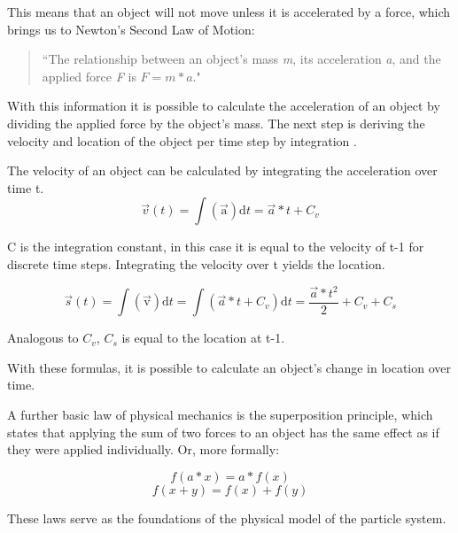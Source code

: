 \documentclass[runningheads,a4paper]{llncs}
\begin{document}
This means that an object will not move unless it is accelerated by a force, which brings us to Newton's Second Law of Motion:
\begin{quotation}
``The relationship between an object's mass \emph{m}, its acceleration \emph{a}, and the applied force \emph{F} is $ F = m*a $."  \cite{Newton}
\end{quotation}

With this information it is possible to calculate the acceleration of an object by dividing the applied force by the object's mass. The next step is deriving the velocity and location of the object per time step by integration \cite{strommer}.

The velocity of an object can be calculated by integrating the acceleration over time t. 
\begin{equation}
\overrightarrow{v}(t) = \int \mathrm{(\overrightarrow{a})} \mathrm{d}t = \overrightarrow{a}*t + C_v
\label{eq:vel}
\end{equation}

C is the integration constant, in this case it is equal to the velocity of t-1 for discrete time steps. Integrating the velocity over t yields the location.

\begin{equation}
\overrightarrow{s}(t) = \int \mathrm{(\overrightarrow{v})} \mathrm{d}t = \int (\overrightarrow{a}*t + C_v) \mathrm{d}t = \frac{\overrightarrow{a}*t^2}{2} + C_v + C_s
\label{eq:loc}
\end{equation}

Analogous to $C_v$, $C_s$ is equal to the location at t-1.

With these formulas, it is possible to calculate an object's change in location over time.

A further basic law of physical mechanics is the superposition principle, which states that applying the sum of two forces to an object has the same effect as if they were applied individually. Or, more formally:

\begin{equation}
f(a * x) = a * f(x)
\label{eq:superpos1}
\end{equation}
\begin{equation}
f(x + y) = f(x) + f(y)
\label{eq:superpos2}
\end{equation}

\cite{wiki}

These laws serve as the foundations of the physical model of the particle system. 
\end{document}
